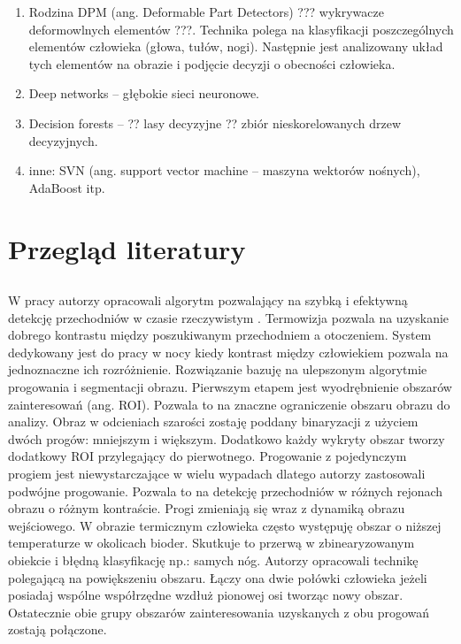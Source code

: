 \begin{enumerate}
\item Rodzina DPM (ang. Deformable Part Detectors) ??? wykrywacze deformowlnych elementów ???. Technika polega na klasyfikacji poszczególnych elementów człowieka (głowa, tułów, nogi). Następnie  jest analizowany układ tych elementów na obrazie i podjęcie decyzji o obecności człowieka.

\item Deep networks – głębokie sieci neuronowe.

\item Decision forests – ?? lasy decyzyjne ?? zbiór nieskorelowanych drzew decyzyjnych.

\item inne: SVN (ang. support vector machine – maszyna wektorów nośnych), AdaBoost itp.
\end{enumerate}

\section{Przegląd literatury}

\subsection{}

	W pracy \cite{kolzpoz} autorzy opracowali algorytm pozwalający na szybką i efektywną detekcję przechodniów w czasie rzeczywistym . Termowizja pozwala na uzyskanie dobrego kontrastu między poszukiwanym przechodniem a otoczeniem. System dedykowany jest do pracy w nocy kiedy kontrast między człowiekiem pozwala na jednoznaczne ich rozróżnienie. Rozwiązanie bazuję na ulepszonym algorytmie progowania i segmentacji obrazu. Pierwszym etapem jest wyodrębnienie obszarów zainteresowań (ang. ROI). Pozwala to na znaczne ograniczenie obszaru obrazu do analizy. Obraz w odcieniach szarości zostaję poddany binaryzacji z użyciem dwóch progów: mniejszym i większym. Dodatkowo każdy wykryty obszar tworzy dodatkowy ROI przylegający do pierwotnego. Progowanie z pojedynczym progiem jest niewystarczające w wielu wypadach dlatego autorzy zastosowali podwójne progowanie. Pozwala to na detekcję przechodniów w różnych rejonach obrazu o różnym kontraście. Progi zmieniają się wraz z dynamiką obrazu wejściowego. W obrazie termicznym człowieka często występuję obszar o niższej temperaturze w okolicach bioder. Skutkuje to przerwą w zbinearyzowanym obiekcie i błędną klasyfikację np.: samych nóg. Autorzy opracowali technikę polegającą na powiększeniu obszaru. Łączy ona dwie połówki człowieka jeżeli posiadaj wspólne współrzędne wzdłuż pionowej osi tworząc nowy obszar. Ostatecznie obie grupy obszarów zainteresowania uzyskanych z obu progowań zostają połączone. 

